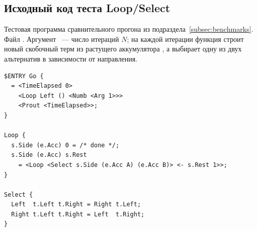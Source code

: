 \clearpage
{}
\label{app:loopselect-src}

\subsection*{Исходный код теста Loop/Select}

Тестовая программа сравнительного прогона из подраздела~\ref{subsec:benchmarks}.
Файл . Аргумент ~---
число итераций $N$; на каждой итерации функция  строит новый
скобочный терм из растущего аккумулятора , а 
выбирает одну из двух альтернатив в зависимости от направления.

\begin{lstlisting}[language=Refal,caption={Тестовая программа Loop/Select},label={lst:app-loopselect}]
$ENTRY Go {
  = <TimeElapsed 0>
    <Loop Left () <Numb <Arg 1>>>
    <Prout <TimeElapsed>>;
}

Loop {
  s.Side (e.Acc) 0 = /* done */;
  s.Side (e.Acc) s.Rest
    = <Loop <Select s.Side (e.Acc A) (e.Acc B)> <- s.Rest 1>>;
}

Select {
  Left  t.Left t.Right = Right t.Left;
  Right t.Left t.Right = Left  t.Right;
}
\end{lstlisting}
